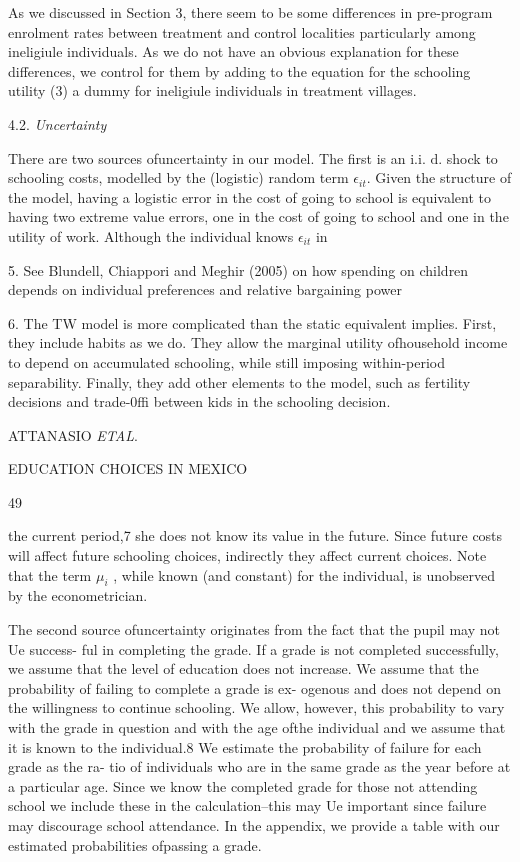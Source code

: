 As we discussed in Section 3, there seem to be some differences in pre-program enrolment rates between treatment and control localities particularly among ineligiule individuals. As we do not have an obvious explanation for these differences, we control for them by adding to the equation for the schooling utility (3) a dummy for ineligiule individuals in treatment villages.

4.2. {\it Uncertainty}

There are two sources ofuncertainty in our model. The first is an i.i. $\mathrm{d}$. shock to schooling costs, modelled by the (logistic) random term $\epsilon_{it}$. Given the structure of the model, having a logistic error in the cost of going to school is equivalent to having two extreme value errors, one in the cost of going to school and one in the utility of work. Although the individual knows $\epsilon_{it}$ in

5. See Blundell, Chiappori and Meghir (2005) on how spending on children depends on individual preferences and relative bargaining power

6. The TW model is more complicated than the static equivalent implies. First, they include habits as we do. They allow the marginal utility ofhousehold income to depend on accumulated schooling, while still imposing within-period separability. Finally, they add other elements to the model, such as fertility decisions and trade-0ffi between kids in the schooling decision.

ATTANASIO {\it ETAL}.

EDUCATION CHOICES IN MEXICO

49

the current period,7 she does not know its value in the future. Since future costs will affect future schooling choices, indirectly they affect current choices. Note that the term $\mu_{i}$ , while known (and constant) for the individual, is unobserved by the econometrician.

The second source ofuncertainty originates from the fact that the pupil may not Ue success- ful in completing the grade. If a grade is not completed successfully, we assume that the level of education does not increase. We assume that the probability of failing to complete a grade is ex- ogenous and does not depend on the willingness to continue schooling. We allow, however, this probability to vary with the grade in question and with the age ofthe individual and we assume that it is known to the individual.8 We estimate the probability of failure for each grade as the ra- tio of individuals who are in the same grade as the year before at a particular age. Since we know the completed grade for those not attending school we include these in the calculation--this may Ue important since failure may discourage school attendance. In the appendix, we provide a table with our estimated probabilities ofpassing a grade.

